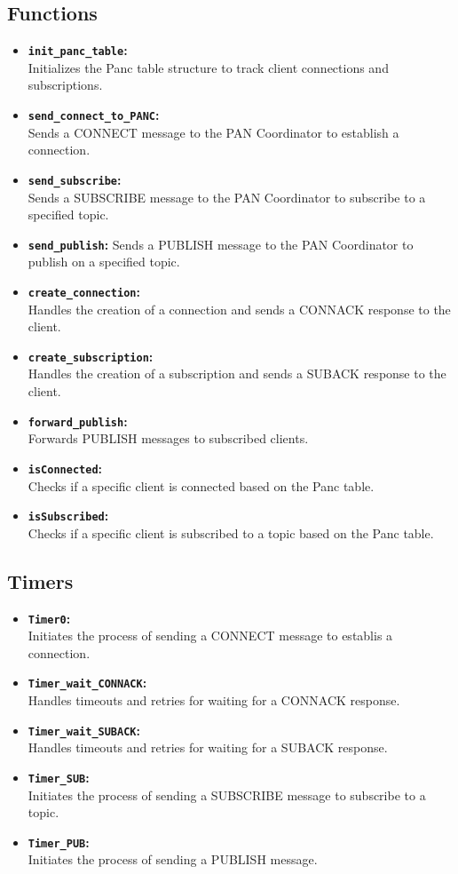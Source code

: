 \documentclass[11pt]{article}
\begin{document}
\subsection*{Functions}
\begin{itemize}
\item{\textbf{\texttt{init\_panc\_table}:}}\\
Initializes the Panc table structure to track client connections and subscriptions.
\item{\textbf{\texttt{send\_connect\_to\_PANC}:}}\\
Sends a CONNECT message to the PAN Coordinator to establish a connection.
\item{\textbf{\texttt{send\_subscribe}:}}\\
Sends a SUBSCRIBE message to the PAN Coordinator to subscribe to a specified topic.
\item{\textbf{\texttt{send\_publish}:}}
Sends a PUBLISH message to the PAN Coordinator to publish on a specified topic.
\item{\textbf{\texttt{create\_connection}:}}\\
Handles the creation of a connection and sends a CONNACK response to the client.
\item{\textbf{\texttt{create\_subscription}:}}\\
Handles the creation of a subscription and sends a SUBACK response to the client.
\item{\textbf{\texttt{forward\_publish}:}}\\
Forwards PUBLISH messages to subscribed clients.
\item{\textbf{\texttt{isConnected}:}}\\
Checks if a specific client is connected based on the Panc table.
\item{\textbf{\texttt{isSubscribed}:}}\\
Checks if a specific client is subscribed to a topic based on the Panc table.
\end{itemize}

\subsection*{Timers}
\begin{itemize}
\item{\textbf{\texttt{Timer0}:}}\\
Initiates the process of sending a CONNECT message to establis a connection.
\item{\textbf{\texttt{Timer\_wait\_CONNACK}:}}\\
Handles timeouts and retries for waiting for a CONNACK response.
\item{\textbf{\texttt{Timer\_wait\_SUBACK}:}}\\
Handles timeouts and retries for waiting for a SUBACK response.
\item{\textbf{\texttt{Timer\_SUB}:}}\\
Initiates the process of sending a SUBSCRIBE message to subscribe to a topic.
\item{\textbf{\texttt{Timer\_PUB}:}}\\
Initiates the process of sending a PUBLISH message.
\end{itemize}
\end{document}
